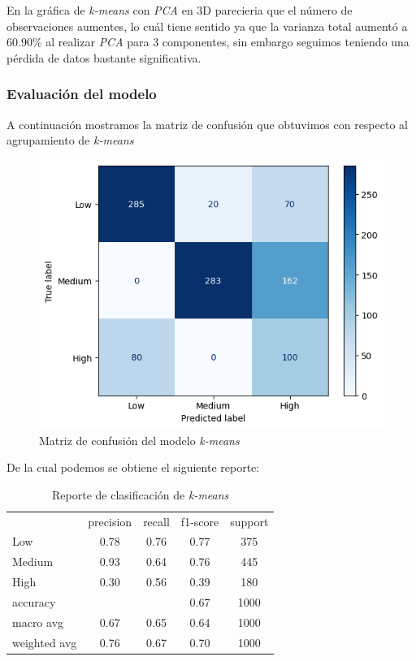 En la gráfica de \textit{k-means} con \textit{PCA} en 3D parecieria que el número de observaciones aumentes, lo cuál tiene sentido ya que la varianza total aumentó a 60.90\% al realizar \textit{PCA} para 3 componentes, sin embargo seguimos teniendo una pérdida de datos bastante significativa. 

\subsubsection{Evaluación del modelo}

A continuación mostramos la matriz de confusión que obtuvimos con respecto al agrupamiento de \textit{k-means}

\begin{figure}[H]
    \centering
    \includegraphics[scale = 0.6]{Enrique/Imagenes/matriz_confusion_k-means.png}
    \caption{Matriz de confusión del modelo \textit{k-means}}
    \label{fig:enter-label}
\end{figure}

De la cual podemos se obtiene el siguiente reporte:

\begin{table}[H]
    \centering
    \begin{tabular}{l c c c c}
        & precision & recall & f1-score & support \\
        Low & 0.78 & 0.76 & 0.77 & 375 \\
        Medium & 0.93 & 0.64 & 0.76 & 445 \\
        High & 0.30 & 0.56 & 0.39 & 180 \\
        accuracy & & & 0.67 & 1000 \\
        macro avg & 0.67 & 0.65 & 0.64 & 1000 \\
        weighted avg & 0.76 & 0.67 & 0.70 & 1000
    \end{tabular}
    \caption{Reporte de clasificación de \textit{k-means} }
\end{table}
  
